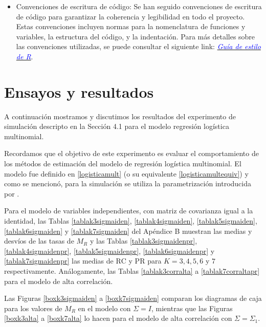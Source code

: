 \documentclass{report}
\begin{document}
\begin{itemize}
	\item Convenciones de escritura de código: Se han seguido convenciones de escritura de código para garantizar la coherencia y legibilidad en todo el proyecto. Estas convenciones incluyen normas para la nomenclatura de funciones y variables, la estructura del código, y la indentación. Para más detalles sobre las convenciones utilizadas, se puede consultar el siguiente link: \href{https://www.datanalytics.com/2014/01/27/guia-de-estilo-de-r-de-google/}{\textcolor{blue}{\textit{Guía de estilo de R}}}.


\end{itemize}






  \chapter{ Ensayos y resultados}\label{reglogmult}
  
  
  
  
   A continuación mostramos y discutimos los resultados del experimento de simulación descripto en la Sección 4.1 para el modelo regresión logística multinomial. 
  
  Recordamos que el objetivo de este experimento es evaluar el comportamiento de los métodos de estimación del modelo de regresión logística multinomial. El modelo fue definido en \eqref{logisticamult} (o su equivalente \eqref{logisticamultequiv}) y como se mencionó, para la simulación se utiliza la parametrización introducida por \cite{friedman2010}.  
  
  
  
  
  
 
 
  
 
 Para el modelo de variables independientes, con matriz de covarianza igual a la identidad, las Tablas \ref{tablak3sigmaiden}, \ref{tablak4sigmaiden}, \ref{tablak5sigmaiden}, \ref{tablak6sigmaiden} y   \ref{tablak7sigmaiden} del Apéndice B muestran las medias y desvíos de las tasas de $M_R$ y las Tablas \ref{tablak3sigmaidenpr}, \ref{tablak4sigmaidenpr}, \ref{tablak5sigmaidenpr}, \ref{tablak6sigmaidenpr} y   \ref{tablak7sigmaidenpr} las medias de $ \mathrm{RC}$  y $ \mathrm{PR}$ para $K=3, 4, 5,6 $ y $7$  respectivamente.   Análogamente, las Tablas 	\ref{tablak3corralta} a \ref{tablak7corraltapr} para el modelo  de alta correlación.  
 
 
 Las Figuras  \ref{boxk3sigmaiden} a  \ref{boxk7sigmaiden} comparan los diagramas de caja 
para los valores de   $M_R$ en el modelo con $\Sigma=I$, mientras que  las Figuras  \ref{boxk3alta} a  \ref{boxk7alta} lo hacen para el modelo de alta correlación con $\Sigma=\Sigma_1$.
\end{document}
